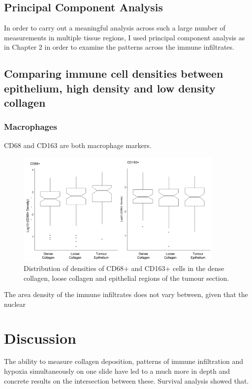 \subsection{Principal Component Analysis}
In order to carry out a meaningful analysis across such a large number of measurements in multiple tissue regions, I used principal component analysis as in Chapter 2 in order to examine the patterns across the immune infiltrates. 

\subsection{Comparing immune cell densities between epithelium, high density and low density collagen}

\subsubsection{Macrophages}

CD68 and CD163 are both macrophage markers. 

\begin{figure}
    \centering
    \includegraphics[width=0.9\textwidth]{Chapter4/figs/Thesis-10.png}
    \caption{Distribution of densities of CD68+ and CD163+ cells in the dense collagen, loose collagen and epithelial regions of the tumour section.}
    \label{fig:distribution}
\end{figure}

The area density of the immune infiltrates does not vary between, given that the nuclear 




\section{Discussion}
The ability to measure collagen deposition, patterns of immune infiltration and hypoxia simultaneously on one slide have led to a much more in depth and concrete results on the intersection between these.
Survival analysis showed that. 


